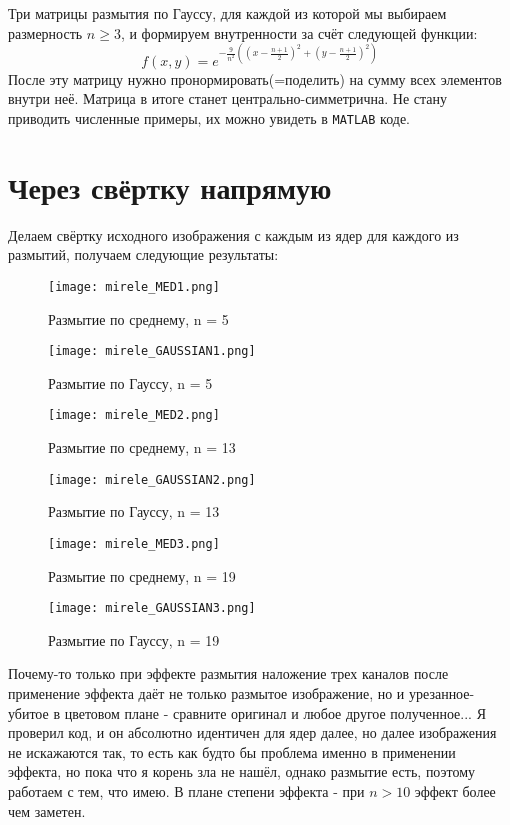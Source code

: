 Три матрицы размытия по Гауссу, для каждой из которой мы выбираем размерность $n \geq 3$, и формируем внутренности за счёт следующей функции:
$$
f(x, y) = e^{-\frac{9}{n^2}( (x - \frac{n+1}{2})^2 + (y - \frac{n+1}{2})^2 )}
$$
После эту матрицу нужно пронормировать(=поделить) на сумму всех элементов внутри неё. Матрица в итоге станет центрально-симметрична. Не стану приводить численные примеры, их можно увидеть в \texttt{MATLAB} коде.
\newpage
\section{Через свёртку напрямую}
Делаем свёртку исходного изображения с каждым из ядер для каждого из размытий, получаем следующие результаты:

\begin{figure}[ht]
    \centering
    \texttt{[image: mirele\_MED1.png]}
	\caption{Размытие по среднему, n = 5}
\end{figure}

\begin{figure}[ht]
    \centering
    \texttt{[image: mirele\_GAUSSIAN1.png]}
	\caption{Размытие по Гауссу, n = 5}
\end{figure}
\newpage
\begin{figure}[ht]
    \centering
    \texttt{[image: mirele\_MED2.png]}
	\caption{Размытие по среднему, n = 13}
\end{figure}

\begin{figure}[ht]
    \centering
    \texttt{[image: mirele\_GAUSSIAN2.png]}
	\caption{Размытие по Гауссу, n = 13}
\end{figure}
\newpage
\begin{figure}[ht]
    \centering
    \texttt{[image: mirele\_MED3.png]}
	\caption{Размытие по среднему, n = 19}
\end{figure}

\begin{figure}[ht]
    \centering
    \texttt{[image: mirele\_GAUSSIAN3.png]}
	\caption{Размытие по Гауссу, n = 19}
\end{figure}
\newpage
Почему-то только при эффекте размытия наложение трех каналов после применение эффекта даёт не только размытое изображение, но и урезанное-убитое в цветовом плане - сравните оригинал и любое другое полученное... Я проверил код, и он абсолютно идентичен для ядер далее, но далее изображения не искажаются так,
то есть как будто бы проблема именно в применении эффекта, но пока что я корень зла не нашёл, однако размытие есть, поэтому работаем с тем, что имею. В плане степени эффекта - при $n>10$ эффект более чем заметен.

